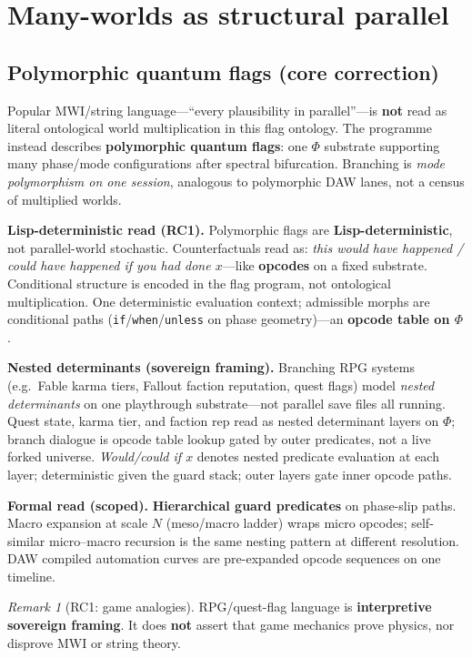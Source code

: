 \documentclass[11pt,a4paper]{article}
\theoremstyle{remark}
\newtheorem*{remark}{Remark}
\theoremstyle{definition}
\begin{document}
\section{Many-worlds as structural parallel}
\label{sec:mwi}

\subsection{Polymorphic quantum flags (core correction)}

Popular MWI/string language---``every plausibility in parallel''---is
\textbf{not} read as literal ontological world multiplication in this flag
ontology.  The programme instead describes \textbf{polymorphic quantum flags}:
one $\Phi$ substrate supporting many phase/mode configurations after spectral
bifurcation.  Branching is \emph{mode polymorphism on one session}, analogous
to polymorphic DAW lanes, not a census of multiplied worlds.

\textbf{Lisp-deterministic read (RC1).}  Polymorphic flags are
\textbf{Lisp-deterministic}, not parallel-world stochastic.  Counterfactuals
read as: \emph{this would have happened / could have happened if you had done
$x$}---like \textbf{opcodes} on a fixed substrate.  Conditional structure is
encoded in the flag program, not ontological multiplication.  One deterministic
evaluation context; admissible morphs are conditional paths
(\texttt{if}/\texttt{when}/\texttt{unless} on phase geometry)---an
\textbf{opcode table on $\Phi$}.

\textbf{Nested determinants (sovereign framing).}  Branching RPG systems
(e.g.\ Fable karma tiers, Fallout faction reputation, quest flags) model
\emph{nested determinants} on one playthrough substrate---not parallel save
files all running.  Quest state, karma tier, and faction rep read as nested
determinant layers on $\Phi$; branch dialogue is opcode table lookup gated
by outer predicates, not a live forked universe.  \emph{Would/could if $x$}
denotes nested predicate evaluation at each layer; deterministic given the
guard stack; outer layers gate inner opcode paths.

\textbf{Formal read (scoped).}  \textbf{Hierarchical guard predicates} on
phase-slip paths.  Macro expansion at scale $N$ (meso/macro ladder) wraps
micro opcodes; self-similar micro--macro recursion is the same nesting
pattern at different resolution.  DAW compiled automation curves are
pre-expanded opcode sequences on one timeline.

\begin{remark}[RC1: game analogies]
RPG/quest-flag language is \textbf{interpretive sovereign framing}.  It
does \textbf{not} assert that game mechanics prove physics, nor disprove
MWI or string theory.
\end{remark}
\end{document}
